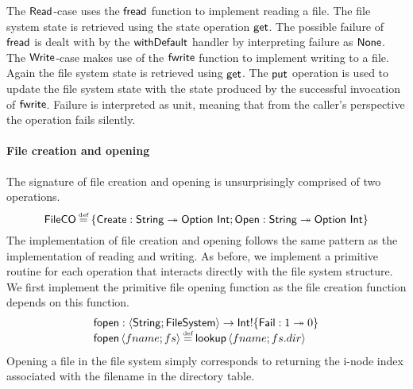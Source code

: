\documentclass[12pt,phd,lfcs,twoside,openright,logo,leftchapter,normalheadings]{infthesis}
\theoremstyle{plain}
\theoremstyle{definition}
\begin{document}
%
The $\mathsf{Read}$-case uses the $\mathsf{fread}$ function to implement reading a
file. The file system state is retrieved using the state operation
$\mathsf{get}$. The possible failure of $\mathsf{fread}$ is dealt with by the
$\mathsf{withDefault}$ handler by interpreting failure as $\mathsf{None}$.
%
The $\mathsf{Write}$-case makes use of the $\mathsf{fwrite}$ function to implement
writing to a file. Again the file system state is retrieved using
$\mathsf{get}$. The $\mathsf{put}$ operation is used to update the file system state
with the state produced by the successful invocation of
$\mathsf{fwrite}$. Failure is interpreted as unit, meaning that from the
caller's perspective the operation fails silently.

\paragraph{File creation and opening}
The signature of file creation and opening is unsurprisingly comprised
of two operations.
%
\[
  \dec{FileCO} \defas \{\UCreate : \String \opto \Option~\Int; \UOpen : \String \opto \Option~\Int\}
\]
%
The implementation of file creation and opening follows the same
pattern as the implementation of reading and writing. As before, we
implement a primitive routine for each operation that interacts
directly with the file system structure. We first implement the
primitive file opening function as the file creation function depends
on this function.
%
\[
  \bl
    \fopen : \Record{\String;\FileSystem} \to \Int \eff \{\Fail : \UnitType \opto \ZeroType\}\\
    \fopen\,\Record{fname;fs} \defas \lookup\,\Record{fname; fs.dir}
  \el
\]
%
Opening a file in the file system simply corresponds to returning the
i-node index associated with the filename in the directory table.
\end{document}
